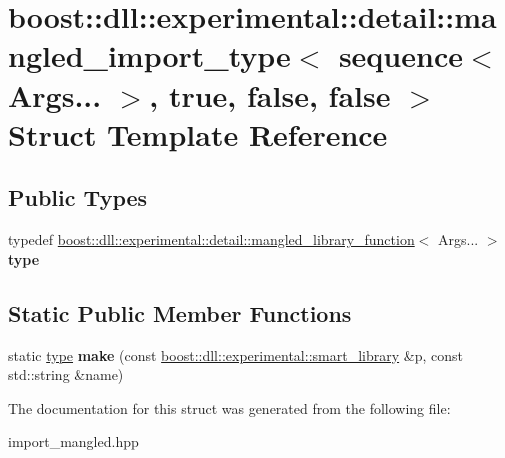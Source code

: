 \hypertarget{a00207}{}\section{boost\+:\+:dll\+:\+:experimental\+:\+:detail\+:\+:mangled\+\_\+import\+\_\+type$<$ sequence$<$ Args... $>$, true, false, false $>$ Struct Template Reference}
\label{a00207}
\subsection*{Public Types}
\begin{DoxyCompactItemize}
\item 
typedef \hyperlink{a00210}{boost\+::dll\+::experimental\+::detail\+::mangled\+\_\+library\+\_\+function}$<$ Args... $>$ {\bfseries type}\hypertarget{a00207_a92be3ca0d42eb637fe448e87f9f753e2}{}\label{a00207_a92be3ca0d42eb637fe448e87f9f753e2}

\end{DoxyCompactItemize}
\subsection*{Static Public Member Functions}
\begin{DoxyCompactItemize}
\item 
static \hyperlink{a00210}{type} {\bfseries make} (const \hyperlink{a00281}{boost\+::dll\+::experimental\+::smart\+\_\+library} \&p, const std\+::string \&name)\hypertarget{a00207_ac9caaf62c6b7cd08646af5e8cf81335e}{}\label{a00207_ac9caaf62c6b7cd08646af5e8cf81335e}

\end{DoxyCompactItemize}


The documentation for this struct was generated from the following file\+:\begin{DoxyCompactItemize}
\item 
import\+\_\+mangled.\+hpp\end{DoxyCompactItemize}

